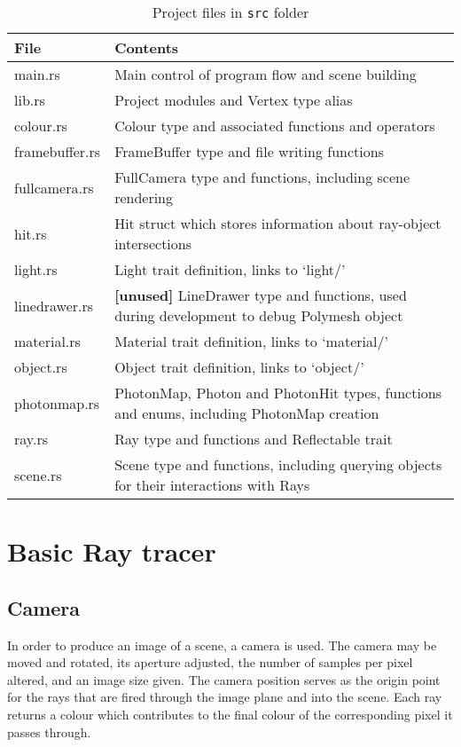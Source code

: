 \documentclass[a4paper]{article}
\begin{document}
\begin{table}[h]
    \centering
    \caption{Project files in \texttt{src} folder}
    \label{tab:projfiles}
        \begin{tabular}{@{}l|l@{}}
            \toprule
            File & Contents \\ \midrule
            main.rs & Main control of program flow and scene building \\
            lib.rs & Project modules and Vertex type alias \\
            colour.rs & Colour type and associated functions and operators \\
            framebuffer.rs & FrameBuffer type and file writing functions \\ 
            fullcamera.rs & FullCamera type and functions, including scene rendering \\
            hit.rs & Hit struct which stores information about ray-object intersections \\
            light.rs & Light trait definition, links to `light/' \\
            linedrawer.rs & \textbf{[unused]} LineDrawer type and functions, used during development to debug Polymesh object \\
            material.rs & Material trait definition, links to `material/' \\
            object.rs &  Object trait definition, links to `object/' \\
            photonmap.rs & PhotonMap, Photon and PhotonHit types, functions and enums, including PhotonMap creation \\
            ray.rs & Ray type and functions and Reflectable trait \\
            scene.rs & Scene type and functions, including querying objects for their interactions with Rays \\
            \bottomrule
        \end{tabular}
\end{table}

\section{Basic Ray tracer}
\subsection{Camera}
In order to produce an image of a scene, a camera is used. The camera may be moved and rotated, its aperture adjusted, the number of samples per pixel altered, and an image size given. The camera position serves as the origin point for the rays that are fired through the image plane and into the scene. Each ray returns a colour which contributes to the final colour of the corresponding pixel it passes through.
\end{document}
